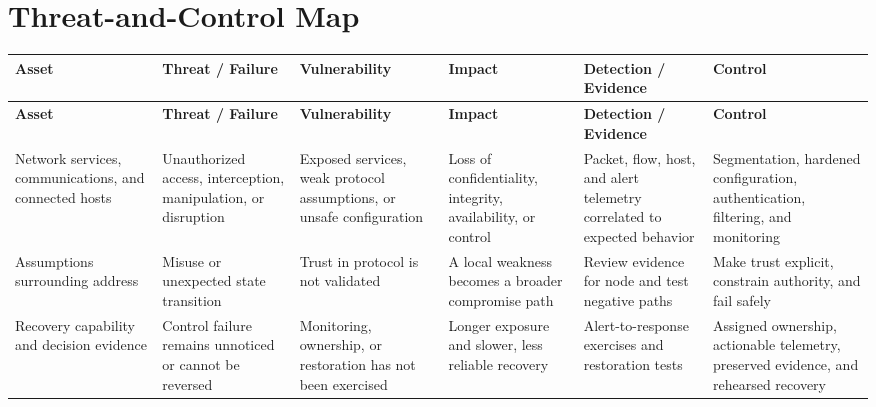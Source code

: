 \documentclass[11pt]{article}
\begin{document}
\section*{Threat-and-Control Map}
\begingroup\scriptsize\setlength{\tabcolsep}{2pt}
\begin{longtable}{>{\RaggedRight\arraybackslash}p{}>{\RaggedRight\arraybackslash}p{}>{\RaggedRight\arraybackslash}p{}>{\RaggedRight\arraybackslash}p{}>{\RaggedRight\arraybackslash}p{}>{\RaggedRight\arraybackslash}p{}}
\toprule\rowcolor{Navy}\color{white}\textbf{Asset} & \color{white}\textbf{Threat / Failure} & \color{white}\textbf{Vulnerability} & \color{white}\textbf{Impact} & \color{white}\textbf{Detection / Evidence} & \color{white}\textbf{Control}\\\midrule
\endfirsthead
\toprule\rowcolor{Navy}\color{white}\textbf{Asset} & \color{white}\textbf{Threat / Failure} & \color{white}\textbf{Vulnerability} & \color{white}\textbf{Impact} & \color{white}\textbf{Detection / Evidence} & \color{white}\textbf{Control}\\\midrule
\endhead
Network services, communications, and connected hosts & Unauthorized access, interception, manipulation, or disruption & Exposed services, weak protocol assumptions, or unsafe configuration & Loss of confidentiality, integrity, availability, or control & Packet, flow, host, and alert telemetry correlated to expected behavior & Segmentation, hardened configuration, authentication, filtering, and monitoring\\\midrule
Assumptions surrounding address & Misuse or unexpected state transition & Trust in protocol is not validated & A local weakness becomes a broader compromise path & Review evidence for node and test negative paths & Make trust explicit, constrain authority, and fail safely\\\midrule
Recovery capability and decision evidence & Control failure remains unnoticed or cannot be reversed & Monitoring, ownership, or restoration has not been exercised & Longer exposure and slower, less reliable recovery & Alert-to-response exercises and restoration tests & Assigned ownership, actionable telemetry, preserved evidence, and rehearsed recovery\\\midrule
\bottomrule
\end{longtable}
\endgroup
\end{document}
